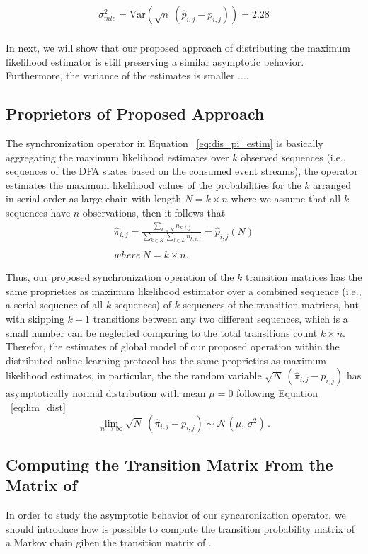 	\begin{equation}
\begin{aligned}
\sigma^{2}_{mle}=\mathrm{Var}(\sqrt{n}\ (\hat{p}_{i,j} - {p}_{i,j}))= 2.28\\
\end{aligned}
\end{equation}


In next, we will show that our proposed approach of distributing the maximum likelihood estimator is still preserving  a similar asymptotic behavior. Furthermore, the variance of the estimates is smaller ....


\subsection{Proprietors of Proposed Approach}
\par The synchronization operator in Equation ~\ref{eq:dis_pi_estim} is basically aggregating  the maximum likelihood estimates over $k$ observed sequences (i.e., sequences of the DFA states based on the consumed event streams), the operator estimates the maximum likelihood values of the probabilities for the $k$ arranged in serial order as large chain with length $ N=k \times n$ where we assume that all $k$ sequences have $n$ observations, then it follows that 
\begin{equation}
\label{eq:dis_pi_estim2}
	\begin{aligned}
\hat{\pi}_{i,j}=\frac{\sum_{k \in K} n_{k,i,j}}{\sum_{k \in K} \sum_{l \in L} n_{k,i,l}} = \hat{p}_{i,j}(N)\\\\
 where\ N = k \times n.
 \end{aligned}
\end{equation}

\par Thus, our proposed synchronization operation of the $k$ transition matrices has the same proprieties as maximum likelihood estimator over a combined sequence (i.e., a serial sequence of all $k$ sequences) of $k$ sequences of the transition matrices, but with skipping $k-1$ transitions between any two different sequences, which is a small number can be neglected comparing to the total transitions count $k \times n$. Therefor, the estimates of global model of our proposed operation within the distributed online learning protocol has the same proprieties as maximum likelihood estimates, in particular, the the random variable $\sqrt{N}\ (\hat{\pi}_{i,j} - {p}_{i,j})$ has asymptotically normal distribution with mean $\mu=0$ following Equation ~\ref{eq:lim_dist}
\begin{equation}
\lim_{n\to\infty} \sqrt{N}\ (\hat{\pi}_{i,j} - {p}_{i,j}) \sim \mathcal{N}(\mu,\,\sigma^{2})\,.
\end{equation} 

\subsection{Computing the Transition Matrix From the Matrix of \pmcmr }

\par In order to study the asymptotic behavior of our synchronization operator, we should introduce how is possible to compute the transition probability matrix  of a Markov chain giben the transition matrix of \pmcmr.